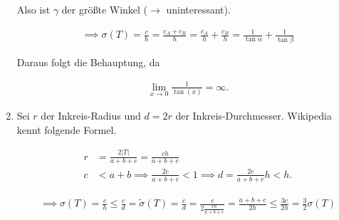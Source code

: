 \begin{solution}
\begin{enumerate}[label = \textbf{\alph*)}]
    Also ist $\gamma$ der größte Winkel ($\to$ uninteressant).

    \begin{align*}
      \implies
      \sigma(T)
      =
      \frac{c}{h}
      =
      \frac{c_A + c_B}{h}
      =
      \frac{c_A}{h} + \frac{c_B}{h}
      =
      \frac{1}{\tan \alpha} + \frac{1}{\tan \beta}
    \end{align*}

    Daraus folgt die Behauptung, da

    \begin{align*}
      \lim_{x \to 0} \frac{1}{\tan(x)} = \infty.
    \end{align*}

    \item Sei $r$ der Inkreis-Radius und $d = 2r$ der Inkreis-Durchmesser.
    Wikipedia kennt folgende Formel.

    \begin{align*}
      r &= \frac{2 |T|}{a + b + c} = \frac{ch}{a + b + c} \\
      c &< a +b \implies \frac{2c}{a+b+c} < 1 \implies d = \frac{2c}{a+b+c}h < h.
    \end{align*}

    \begin{align*}
      \implies
      \sigma(T)
      =
      \frac{c}{h}
      \leq
      \frac{c}{d}
      =
      \tilde{\sigma}(T)
      =
      \frac{c}{d}
      =
      \frac{c}
      {
        2 \frac{ch}{a + b + c}
      }
      =
      \frac{a + b + c}{2h}
      \leq
      \frac{3c}{2h}
      =
      \frac{3}{2} \sigma(T)
    \end{align*}

  \end{enumerate}

  \end{solution}

